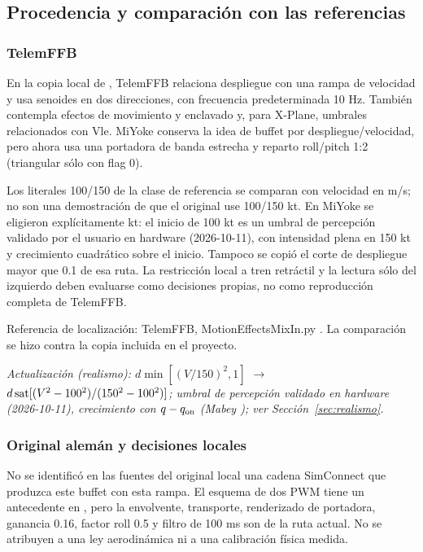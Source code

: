\subsection{Procedencia y comparación con las referencias}
\subsubsection{TelemFFB}
En la copia local de , TelemFFB relaciona despliegue con una rampa de velocidad y usa senoides en dos direcciones, con frecuencia predeterminada 10 Hz. También contempla efectos de movimiento y enclavado y, para X-Plane, umbrales relacionados con Vle. MiYoke conserva la idea de buffet por despliegue/velocidad, pero ahora usa una portadora de banda estrecha y reparto roll/pitch 1:2 (triangular sólo con flag 0).

Los literales 100/150 de la clase de referencia se comparan con velocidad en m/s; no son una demostración de que el original use 100/150 kt. %
En MiYoke se eligieron explícitamente kt: el inicio de 100 kt es un umbral de percepción validado por el usuario en hardware (2026-10-11), con intensidad plena en 150 kt y crecimiento cuadrático sobre el inicio. Tampoco se copió el corte de despliegue mayor que 0.1 de esa ruta. La restricción local a tren retráctil y la lectura sólo del izquierdo deben evaluarse como decisiones propias, no como reproducción completa de TelemFFB.

Referencia de localización: TelemFFB, MotionEffectsMixIn.py \cite{telemffb}. La comparación se hizo contra la copia incluida en el proyecto.

\textit{Actualización (realismo): $d\min[(V/150)^2,1]$ $\rightarrow$ $d\operatorname{sat}[(V^2-100^2)/(150^2-100^2)]$; umbral de percepción validado en hardware (2026-10-11), crecimiento con $q-q_{\rm on}$ (Mabey \cite{mabey1988}); ver Sección~\ref{sec:realismo}.}

\subsubsection{Original alemán y decisiones locales}
No se identificó en las fuentes del original local una cadena SimConnect que produzca este buffet con esta rampa. El esquema de dos PWM tiene un antecedente en , pero la envolvente, transporte, renderizado de portadora, ganancia 0.16, factor roll 0.5 y filtro de 100 ms son de la ruta actual. No se atribuyen a una ley aerodinámica ni a una calibración física medida.


